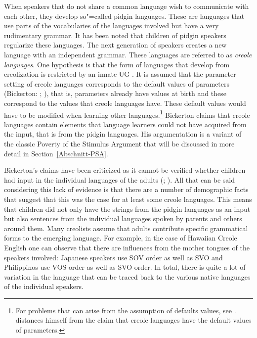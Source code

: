 When speakers that do not share a common language wish to communicate with each other, they develop so"=called
pidgin languages. These are languages that use parts of the vocabularies of the languages involved but have a very rudimentary
grammar. It has been noted that children of pidgin speakers regularize these languages. The next generation of speakers creates a new language with an independent
grammar. These languages are referred to as \emph{creole languages}.
One hypothesis is that the form of languages that develop from creolization is restricted by an innate UG \citep{Bickerton84a}. It is assumed that
the parameter setting of creole languages corresponds to the default values of parameters (Bickerton: \citeyear[]{Bickerton84b};
\citeyear[]{Bickerton84a}), that is, parameters already have values at birth and these
correspond to the values that creole languages have. These default values would have to be modified when learning other languages.\footnote{
	For problems that can arise from the assumption of defaults values, see  . \citet[, fn.\,13]{Bickerton97a} distances himself from the claim that creole languages have
  the default values of parameters.
} 
Bickerton claims that creole languages contain elements that language learners could not have
acquired from the input, that is from the pidgin languages. His argumentation is a variant of the classic Poverty of the Stimulus Argument that will be discussed in more detail in Section~\ref{Abschnitt-PSA}.

Bickerton's claims have been criticized as it cannot be verified whether children had input in the individual languages
of the adults (\citealp[]{Samarin84a};
\citealp[]{Seuren84a}). All that can be said considering this lack of evidence is that there are a number
of demographic facts that suggest that this was the case for at least some creole languages.
This means that children did not only have the strings from the pidgin languages as an input but
also sentences from the individual languages spoken by parents and others around them. Many creolists assume that adults contribute specific grammatical forms to the emerging language. For example, in the case of Hawaiian Creole English
one can observe that there are influences from the mother tongues of the speakers involved: Japanese speakers use SOV order as well as SVO and Philippinos use VOS order as well
as SVO order. In total, there is quite a lot of variation in the language that can be traced back to the various native languages of the individual speakers.

